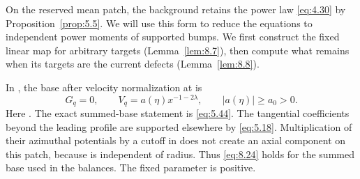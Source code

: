 %
On the reserved mean patch, the background retains the power law \eqref{eq:4.30} by
Proposition~\ref{prop:5.5}. We will use this form to reduce the equations to independent power
moments of supported bumps. We first construct the fixed linear map for arbitrary targets
(Lemma~\ref{lem:8.7}), then compute what remains when its targets are the current defects
(Lemma~\ref{lem:8.8}).

In , the base after velocity normalization at
 is
\begin{equation}
G_q=0,\qquad V_q=a(\eta)x^{-1-2\lambda},\qquad |a(\eta)|\ge a_0>0.
\tag{8.24}\label{eq:8.24}
\end{equation}
Here . The exact
summed-base statement is \eqref{eq:5.44}. The tangential coefficients beyond the leading profile
are supported elsewhere by \eqref{eq:5.18}. Multiplication of their azimuthal potentials by a cutoff
in  does not create an axial component on this patch, because
 is independent of radius. Thus \eqref{eq:8.24} holds for the summed base
used in the balances. The fixed parameter  is positive.

